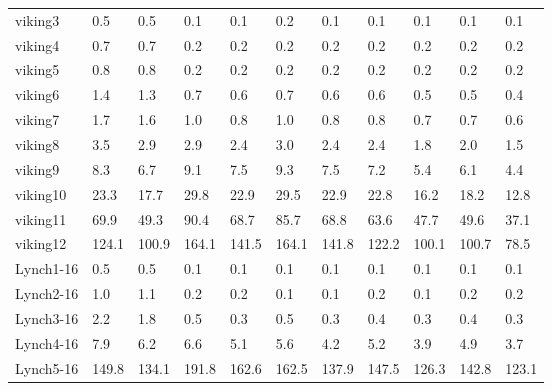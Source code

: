 \begin{table}
\begin{adjustbox}{max totalheight=\textheight}
\begin{tabular}{|l|llllllllll|}
    viking3            & 0.5      & 0.5      & 0.1      & 0.1      & 0.2      & 0.1      & 0.1      & 0.1      & 0.1      & 0.1      \\
    viking4            & 0.7      & 0.7      & 0.2      & 0.2      & 0.2      & 0.2      & 0.2      & 0.2      & 0.2      & 0.2      \\
    viking5            & 0.8      & 0.8      & 0.2      & 0.2      & 0.2      & 0.2      & 0.2      & 0.2      & 0.2      & 0.2      \\
    viking6            & 1.4      & 1.3      & 0.7      & 0.6      & 0.7      & 0.6      & 0.6      & 0.5      & 0.5      & 0.4      \\
    viking7            & 1.7      & 1.6      & 1.0      & 0.8      & 1.0      & 0.8      & 0.8      & 0.7      & 0.7      & 0.6      \\
    viking8            & 3.5      & 2.9      & 2.9      & 2.4      & 3.0      & 2.4      & 2.4      & 1.8      & 2.0      & 1.5      \\
    viking9            & 8.3      & 6.7      & 9.1      & 7.5      & 9.3      & 7.5      & 7.2      & 5.4      & 6.1      & 4.4      \\
    viking10           & 23.3     & 17.7     & 29.8     & 22.9     & 29.5     & 22.9     & 22.8     & 16.2     & 18.2     & 12.8     \\
    viking11           & 69.9     & 49.3     & 90.4     & 68.7     & 85.7     & 68.8     & 63.6     & 47.7     & 49.6     & 37.1     \\
    viking12           & 124.1    & 100.9    & 164.1    & 141.5    & 164.1    & 141.8    & 122.2    & 100.1    & 100.7    & 78.5     \\ \hline
    Lynch1-16          & 0.5      & 0.5      & 0.1      & 0.1      & 0.1      & 0.1      & 0.1      & 0.1      & 0.1      & 0.1      \\
    Lynch2-16          & 1.0      & 1.1      & 0.2      & 0.2      & 0.1      & 0.1      & 0.2      & 0.1      & 0.2      & 0.2      \\
    Lynch3-16          & 2.2      & 1.8      & 0.5      & 0.3      & 0.5      & 0.3      & 0.4      & 0.3      & 0.4      & 0.3      \\
    Lynch4-16          & 7.9      & 6.2      & 6.6      & 5.1      & 5.6      & 4.2      & 5.2      & 3.9      & 4.9      & 3.7      \\
    Lynch5-16          & 149.8    & 134.1    & 191.8    & 162.6    & 162.5    & 137.9    & 147.5    & 126.3    & 142.8    & 123.1    \\ \hline

\end{tabular}
\end{adjustbox}
\end{table}
